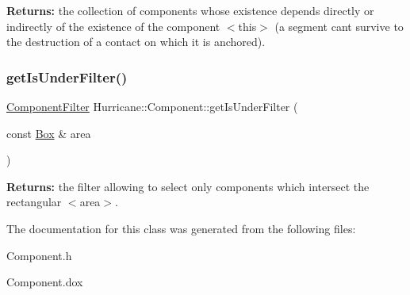 {\bfseries Returns\+:} the collection of components whose existence depends directly or indirectly of the existence of the component {\ttfamily $<$this$>$} (a segment can\textquotesingle{}t survive to the destruction of a contact on which it is anchored). \mbox{\label{classHurricane_1_1Component_a8680f2756892366db8642bfcfd7ce097}} 
\subsubsection{\texorpdfstring{get\+Is\+Under\+Filter()}{getIsUnderFilter()}}
{\footnotesize\ttfamily \mbox{\hyperlink{namespaceHurricane_acbfacb3aada84aa054e587817f204e90}{Component\+Filter}} Hurricane\+::\+Component\+::get\+Is\+Under\+Filter (\begin{DoxyParamCaption}\item[{const \mbox{\hyperlink{classHurricane_1_1Box}{Box}} \&}]{area }\end{DoxyParamCaption})\hspace{0.3cm}{\ttfamily [static]}}

{\bfseries Returns\+:} the filter allowing to select only components which intersect the rectangular {\ttfamily $<$area$>$}. 

The documentation for this class was generated from the following files\+:\begin{DoxyCompactItemize}
\item 
Component.\+h\item 
Component.\+dox\end{DoxyCompactItemize}
